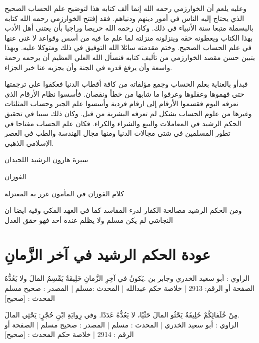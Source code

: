 وعليه يلعم أن الخوارزمي رحمه الله إنما ألف كتابه هذا لتوضيح علم الحساب الصحيح الذي يحتاج إليه الناس في أمور دينهم ودنياهم. فقد إفتتح الخوارزمي رحمه الله كتابه بالبسملة متبعا سنة الأنبياء في ذلك. وكان رحمه الله حريصا وراجيا بأن يعتنى أهل الأدب بهذا الكتاب ويعطونه حقه وينزلونه منزلته لما علم ما فيه من أسس وقواعد لا غنى عنها في علم الحساب الصحيح. وختم مقدمته سائلا الله التوفيق في ذلك ومتوكلا عليه. وبهذا يتبين حسن مقصد الخوارزمي من تأليف كتابه فنسأل الله العلي العظيم أن يرحمه رحمة واسعة وأن يرفغ قدره في الجنة وأن يجزيه عنا خير الجزاء.

فبدأو بالعناية بعلم الحساب وجمع مؤلفاته من كافة أقطاب الدنيا فعكفوا على ترجمتها حتى فهموها وعقلوها وعرفوا ما شابها من خطأ ونقصان. فأسسوا نظام الأرقام الذي نعرفه اليوم فقسموا الأرقام إلى ارقام فردية وأسسوا علم الجبر وحساب المثلثات وغيرها من علوم الحساب بشكل لم تعرفه البشرية من قبل. وكان ذلك سببا في تحقيق الحكم الرشيد في المعاملات والبيع والشراء والكراء. فكان علم الحساب مفتاحا في تطور المسلمين في شتى مجالات الدنيا ومنها مجال الهندسة والطب في العصر الإسلامي الذهبي.


سيرة هارون الرشيد
اللحيدان

الفوزان


كلام الفوزان في المأمون
غرر به المعتزلة

ومن الحكم الرشيد مصالحة الكفار لدرء المفاسد كما في العهد المكي
وفيه ايضا ان النجاشي لم يكن مسلم ولا  يظلم عنده أحد فهو حقق العدل



\section{عودة الحكم الرشيد في آخر الزَّمانِ}



‎يَكونُ في آخِرِ الزَّمانِ خَلِيفَةٌ يَقْسِمُ المالَ ولا يَعُدُّهُ.
‎الراوي : أبو سعيد الخدري وجابر بن عبدالله | المحدث :مسلم | المصدر : صحيح مسلم
‎الصفحة أو الرقم: 2913 | خلاصة حكم المحدث : [صحيح]


‎مِنْ خُلَفائِكُمْ خَلِيفَةٌ يَحْثُو المالَ حَثْيًا، لا يَعُدُّهُ عَدَدًا. وفي رِوايَةِ ابْنِ حُجْرٍ: يَحْثِي المالَ.
‎الراوي : أبو سعيد الخدري | المحدث : مسلم | المصدر : صحيح مسلم | الصفحة أو الرقم : 2914 | خلاصة حكم المحدث : [صحيح]
   





